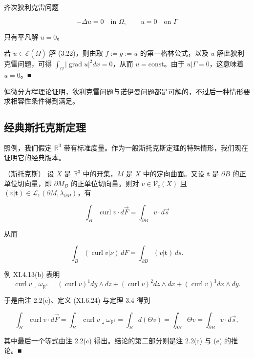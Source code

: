 \begin{proposition}

齐次狄利克雷问题

\begin{equation}
-\Delta u = 0 \quad \text{in } \Omega, \qquad u = 0 \quad \text{on } \Gamma\tag{3.22}
\end{equation}

只有平凡解 $ u = 0 $。

\proofhead
若 $ u \in \mathcal{E}(\overline{\Omega}) $ 解 (3.22)，则由取 $ f := g := u $ 的第一格林公式，以及 $ u $ 解此狄利克雷问题，可得 $ \int_\Omega |\operatorname{grad} u|^2 dx = 0 $，从而 $ u = \mathrm{const} $。由于 $ u|\Gamma = 0 $，这意味着 $ u = 0 $。\nobreak\hspace{0.35em}■
\end{proposition}

偏微分方程理论证明，狄利克雷问题与诺伊曼问题都是可解的，不过后一种情形要求相容性条件得到满足。

\subsection*{经典斯托克斯定理}

照例，我们假定 $ \mathbb{R}^3 $ 带有标准度量。作为一般斯托克斯定理的特殊情形，我们现在证明它的经典版本。

\begin{theorem}

（斯托克斯） 设 $ X $ 是 $ \mathbb{R}^3 $ 中的开集，$ M $ 是 $ X $ 中的定向曲面。又设 $ \mathbf{t} $ 是 $ \partial B $ 的正单位切向量，即 $ \partial M_B $ 的正单位切向量。则对 $ v \in \mathcal{V}_c(X) $ 且 $ (v|\mathbf{t}) \in \mathcal{L}_1(\partial M, \lambda_{\partial M}) $，有

\[
\int_B \operatorname{curl} v \cdot d\vec{F} = \int_{\partial B} v \cdot d\vec{s}
\]

从而

\[
\int_B (\operatorname{curl} v|\nu)\, dF = \int_{\partial B} (v|\mathbf{t})\, ds .
\]

\proofhead
例 XI.4.13(b) 表明
\[
\operatorname{curl} v \lrcorner \omega_{\mathbb{R}^3} = (\operatorname{curl} v)^1 dy \wedge dz + (\operatorname{curl} v)^2 dz \wedge dx + (\operatorname{curl} v)^3 dx \wedge dy .
\]

于是由注 2.2(e)、定义 (XI.6.24) 与定理 3.4 得到

\[
\int_B \operatorname{curl} v \cdot d\vec{F} = \int_B \operatorname{curl} v \lrcorner \omega_{\mathbb{R}^3} = \int_B d(\Theta v) = \int_{\partial B} \Theta v = \int_{\partial B} v \cdot d\vec{s} ,
\]

其中最后一个等式由注 2.2(c) 得出。结论的第二部分则是注 2.2(c) 与 (e) 的推论。\nobreak\hspace{0.35em}■

\end{theorem}

